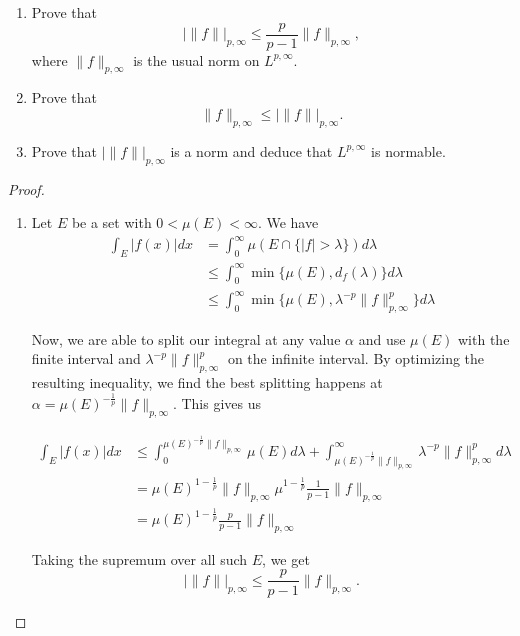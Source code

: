 \documentclass[a4paper]{article}
\begin{document}
\begin{enumerate}
    \begin{enumerate}
      \item Prove that
        \[ | \| f \| |_{p,\infty} \leq \frac{p}{p-1} \|f\|_{p,\infty} ,\]
        where $\|f\|_{p,\infty}$ is the usual norm on $L^{p,\infty}$.

      \item Prove that
        \[ \|f\|_{p,\infty} \leq | \| f \| |_{p,\infty} .\]

      \item Prove that $| \| f \| |_{p,\infty}$ is a norm and deduce that $L^{p,\infty}$ is normable.

    \end{enumerate}

    \begin{proof}

      \begin{enumerate}
        \item
          Let $E$ be a set with $0<\mu(E)<\infty$. We have
          \begin{align*}
            \int_{E}^{} |f(x)| dx &= \int_{0}^{\infty} \mu( E \cap \{ |f| > \lambda \} ) d\lambda \\
            &\leq \int_{0}^{\infty} \min \{ \mu(E), d_f(\lambda) \} d\lambda \\
            &\leq \int_{0}^{\infty} \min \{ \mu(E), \lambda^{-p} \|f\|_{p,\infty}^p \} d\lambda
          \end{align*}

          Now, we are able to split our integral at any value $\alpha$ and use $\mu(E)$ with the finite interval and $\lambda^{-p} \|f\|_{p,\infty}^p$
          on the infinite interval. By optimizing the resulting inequality, we find the best splitting happens at $\alpha =
          \mu(E)^{-\frac{1}{p}} \|f\|_{p,\infty}$. This gives us

          \begin{align*}
            \int_{E}^{} |f(x)| dx &\leq \int_{0}^{\mu(E)^{-\frac{1}{p}} \|f\|_{p,\infty}} \mu(E) d\lambda + \int_{\mu(E)^{-\frac{1}{p}} \|f\|_{p,\infty}}^{\infty}
            \lambda^{-p} \|f\|_{p,\infty}^p d\lambda \\
            &= \mu(E)^{1-\frac{1}{p}} \|f\|_{p,\infty} \mu^{1-\frac{1}{p}} \frac{1}{p-1} \|f\|_{p,\infty} \\
            &= \mu(E)^{1-\frac{1}{p}} \frac{p}{p-1} \|f\|_{p,\infty}
          \end{align*}

          Taking the supremum over all such $E$, we get
          \[ | \|f\| |_{p,\infty} \leq \frac{p}{p-1} \| f \|_{p,\infty} .\]


\end{enumerate}
\end{proof}
\end{enumerate}
\end{document}
